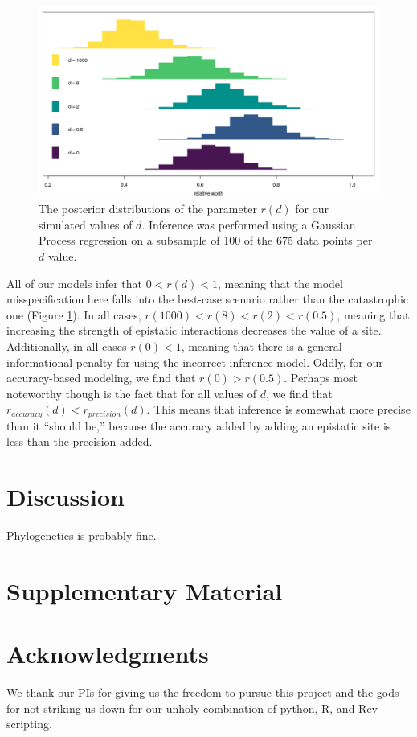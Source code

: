 \documentclass[11pt]{article}
\begin{document}
\begin{figure}
  \centering
  \includegraphics[width=\textwidth]{figures/accuracy_worth.png}
  \caption{
    The posterior distributions of the parameter $r(d)$ for our simulated values of $d$.
    Inference was performed using a Gaussian Process regression on a subsample of 100 of the 675 data points per $d$ value.
  }
  \label{fig:worth}
\end{figure}

All of our models infer that $0 < r(d) < 1$, meaning that the model misspecification here falls into the best-case scenario rather than the catastrophic one (Figure \ref{fig:worth}).
In all cases, $r(1000) < r(8) < r(2) < r(0.5)$, meaning that increasing the strength of epistatic interactions decreases the value of a site.
Additionally, in all cases $r(0) < 1$, meaning that there is a general informational penalty for using the incorrect inference model.
Oddly, for our accuracy-based modeling, we find that $r(0) > r(0.5)$.
Perhaps most noteworthy though is the fact that for all values of $d$, we find that $r_{accuracy}(d) < r_{precision}(d)$.
This means that inference is somewhat more precise than it ``should be,'' because the accuracy added by adding an epistatic site is less than the precision added.


\section*{Discussion\label{sec:discussion}}

Phylogenetics is probably fine.

\section*{Supplementary Material}


\section*{Acknowledgments}
We thank our PIs for giving us the freedom to pursue this project and the gods for not striking us down for our unholy combination of python, R, and Rev scripting.



\end{document}
